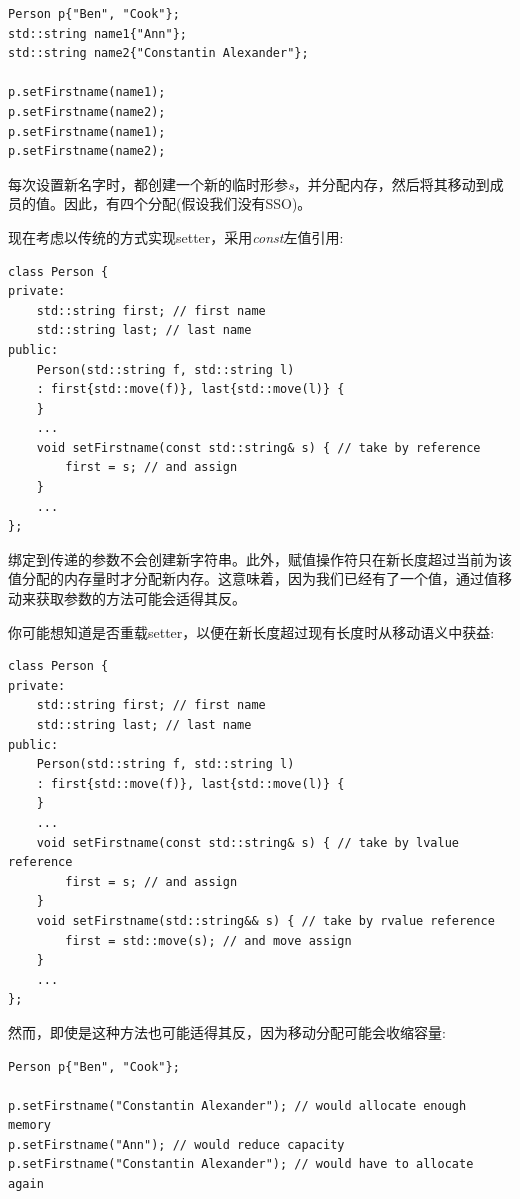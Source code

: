 \begin{lstlisting}[caption={}]
Person p{"Ben", "Cook"};
std::string name1{"Ann"};
std::string name2{"Constantin Alexander"};

p.setFirstname(name1);
p.setFirstname(name2);
p.setFirstname(name1);
p.setFirstname(name2);
\end{lstlisting}

每次设置新名字时，都创建一个新的临时形参\textit{s}，并分配内存，然后将其移动到成员的值。因此，有四个分配(假设我们没有SSO)。\par

现在考虑以传统的方式实现setter，采用\textit{const}左值引用:\par

\begin{lstlisting}[caption={}]
class Person {
private:
	std::string first; // first name
	std::string last; // last name
public:
	Person(std::string f, std::string l)
	: first{std::move(f)}, last{std::move(l)} {
	}
	...
	void setFirstname(const std::string& s) { // take by reference
		first = s; // and assign
	}
	...
};
\end{lstlisting}

绑定到传递的参数不会创建新字符串。此外，赋值操作符只在新长度超过当前为该值分配的内存量时才分配新内存。这意味着，因为我们已经有了一个值，通过值移动来获取参数的方法可能会适得其反。\par

你可能想知道是否重载setter，以便在新长度超过现有长度时从移动语义中获益:\par

\begin{lstlisting}[caption={}]
class Person {
private:
	std::string first; // first name
	std::string last; // last name
public:
	Person(std::string f, std::string l)
	: first{std::move(f)}, last{std::move(l)} {
	}
	...
	void setFirstname(const std::string& s) { // take by lvalue reference
		first = s; // and assign
	}
	void setFirstname(std::string&& s) { // take by rvalue reference
		first = std::move(s); // and move assign
	}
	...
};
\end{lstlisting}

然而，即使是这种方法也可能适得其反，因为移动分配可能会收缩容量:\par

\begin{lstlisting}[caption={}]
Person p{"Ben", "Cook"};

p.setFirstname("Constantin Alexander"); // would allocate enough memory
p.setFirstname("Ann"); // would reduce capacity
p.setFirstname("Constantin Alexander"); // would have to allocate again
\end{lstlisting}

